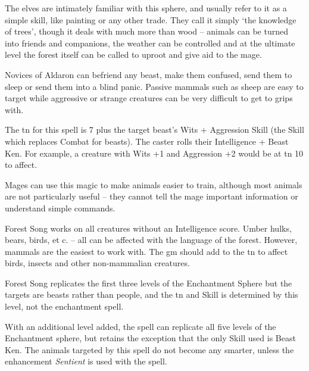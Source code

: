 \begin{multicols}{2}

\noindent
The elves are intimately familiar with this sphere, and usually refer to it as a simple skill, like painting or any other trade. They call it simply `the knowledge of trees', though it deals with much more than wood -- animals can be turned into friends and companions, the weather can be controlled and at the ultimate level the forest itself can be called to uproot and give aid to the mage.

\spelllevel

\label{forestsong}
\noindent
Novices of Aldaron can befriend any beast, make them confused, send them to sleep or send them into a blind panic.
Passive mammals such as sheep are easy to target while aggressive or strange creatures can be very difficult to get to grips with.

The \gls{tn} for this spell is 7 plus the target beast's Wits + Aggression Skill (the Skill which replaces Combat for beasts). The caster rolls their Intelligence + Beast Ken. For example, a creature with Wits +1 and Aggression +2 would be at \gls{tn} 10 to affect.

Mages can use this magic to make animals easier to train, although most animals are not particularly useful -- they cannot tell the mage important information or understand simple commands.

Forest Song works on all creatures without an Intelligence score.
Umber hulks, bears, birds, et c. -- all can be affected with the language of the forest.
However, mammals are the easiest to work with.
The \gls{gm} should add to the \gls{tn} to affect birds, insects and other non-mammalian creatures.

Forest Song replicates the first three levels of the Enchantment Sphere but the targets are beasts rather than people, and the \gls{tn} and Skill is determined by this level, not the enchantment spell.


With an additional level added, the spell can replicate all five levels of the Enchantment sphere, but retains the exception that the only Skill used is Beast Ken.
The animals targeted by this spell do not become any smarter, unless the enhancement \textit{Sentient} is used with the spell.

\\
\label{light}


\end{multicols}
